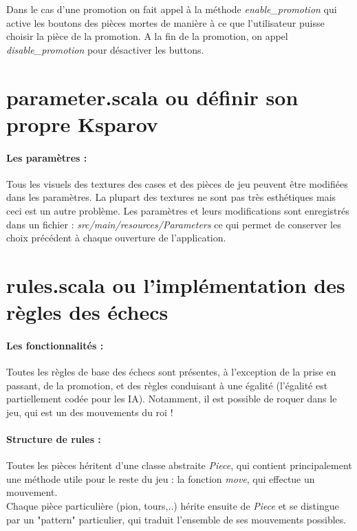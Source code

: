 \documentclass[a4paper]{article}
\begin{document}
Dans le cas d'une promotion on fait appel à la méthode \textit{enable\_promotion} qui active les boutons des pièces mortes de manière à ce que l'utilisateur puisse choisir la pièce de la promotion. A la fin de la promotion, on appel \textit{disable\_promotion} pour désactiver les buttons.

\section{parameter.scala ou définir son propre Ksparov}

\paragraph{Les paramètres :}Tous les visuels des textures des cases et des pièces de jeu peuvent être modifiées dans les paramètres. La plupart des textures ne sont pas très esthétiques mais ceci est un autre problème. Les paramètres et leurs modifications sont enregistrés dans un fichier : \textit{src/main/resources/Parameters} ce qui permet de conserver les choix précédent à chaque ouverture de l'application.

\section{rules.scala ou l'implémentation des règles des échecs}

\paragraph{Les fonctionnalités :} Toutes les règles de base des échecs sont présentes, à l'exception de la prise en passant, de la promotion, et des règles conduisant à une égalité (l'égalité est partiellement codée pour les IA). Notamment, il est possible de roquer dans le jeu, qui est un des mouvements du roi !

\paragraph{Structure de rules :} Toutes les pièces héritent d'une classe abstraite \textit{Piece}, qui contient principalement une méthode utile pour le reste du jeu : la fonction \textit{move}, qui effectue un mouvement. \\
Chaque pièce particulière (pion, tours,..) hérite ensuite de \textit{Piece} et se distingue par un "pattern" particulier, qui traduit l'ensemble de ses mouvements possibles. \\
\end{document}
